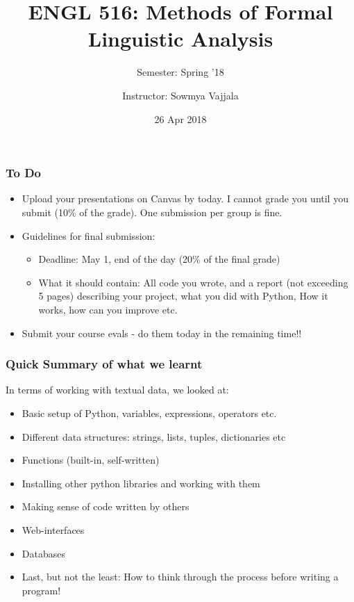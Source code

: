 \documentclass{beamer}
\author[Sowmya Vajjala]{Instructor: Sowmya Vajjala}
\title[ENGL 516]{ENGL 516: Methods of Formal Linguistic Analysis}
\subtitle{Semester: Spring '18}
\date{26 Apr 2018}
\institute{Iowa State University, USA}
\begin{document}
\begin{frame}\titlepage
\end{frame}

\begin{frame}
\frametitle{To Do}
\begin{itemize}
\item Upload your presentations on Canvas by today. I cannot grade you until you submit (10\% of the grade). One submission per group is fine. 
\item Guidelines for final submission:
\begin{itemize}
\item Deadline: May 1, end of the day (20\% of the final grade)
\item What it should contain: All code you wrote, and a report (not exceeding 5 pages) describing your project, what you did with Python, How it works, how can you improve etc.
\end{itemize}
\item Submit your course evals - do them today in the remaining time!!
\end{itemize}
\end{frame}

\begin{frame}
\frametitle{Quick Summary of what we learnt}
In terms of working with textual data, we looked at:
\begin{itemize}
\item Basic setup of Python, variables, expressions, operators etc.
\item Different data structures: strings, lists, tuples, dictionaries etc
\item Functions (built-in, self-written)
\item Installing other python libraries and working with them
\item Making sense of code written by others
\item Web-interfaces
\item Databases
\item Last, but not the least: How to think through the process before writing a program!
\end{itemize}
\end{frame}
\end{document}
